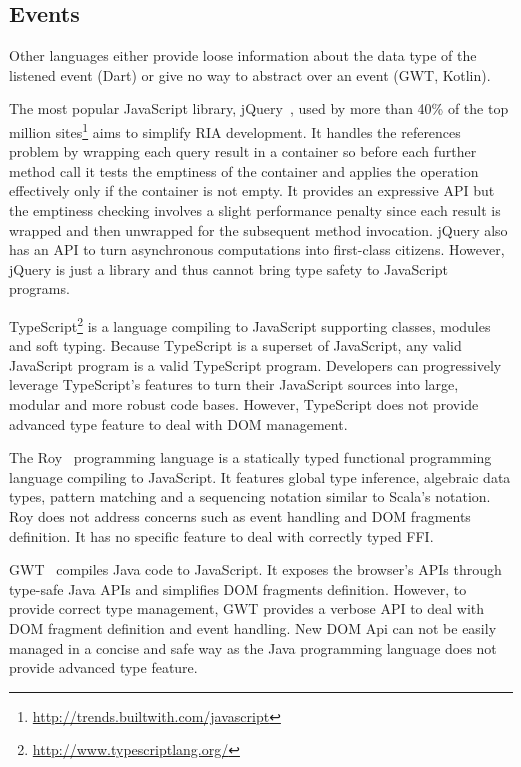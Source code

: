 \documentclass[runningheads,a4paper]{llncs}
\begin{document}
\subsection{Events}


Other languages either provide loose information about the data type of the listened event (Dart) or
give no way to abstract over an event (GWT, Kotlin).

The most popular JavaScript library, jQuery~\cite{Bibeault08_jQuery}, used by more than 40\% of the top million
sites\footnote{\href{http://trends.builtwith.com/javascript}{http://trends.builtwith.com/javascript}} aims to
simplify RIA development. It handles the  references problem by wrapping each query result in a container
so before each further method call it tests the emptiness of the container and applies the operation effectively only
if the container is not empty. It provides an expressive API but the emptiness checking involves a slight performance
penalty since each result is wrapped and then unwrapped for the subsequent method invocation. jQuery also has an API
to turn asynchronous computations into first-class citizens. However, jQuery is just a library and thus cannot bring
type safety to JavaScript programs.

TypeScript\footnote{\href{http://www.typescriptlang.org/}{http://www.typescriptlang.org/}} is a language compiling to
JavaScript supporting classes, modules and soft typing. Because TypeScript is a superset of JavaScript, any valid
JavaScript program is a valid TypeScript program. Developers can progressively leverage TypeScript’s features to turn
their JavaScript sources into large, modular and more robust code bases. However, TypeScript does not provide advanced type feature to deal with DOM management.

The Roy~\cite{McKenna_Roy} programming language is a statically typed functional programming language compiling to
JavaScript. It features global type inference, algebraic data types, pattern matching and a sequencing notation
similar to Scala’s  notation. Roy does not address concerns such as event handling and DOM fragments
definition. It has no specific feature to deal with correctly typed FFI. 


GWT~\cite{Chaganti07_GWT} compiles Java code to JavaScript. It exposes the browser’s APIs through type-safe Java APIs
and simplifies DOM fragments definition. However, to provide correct type management, GWT provides a verbose API to deal with DOM fragment definition and event handling. New DOM Api can not be easily managed in a concise and safe way as the Java programming language does not provide advanced type feature. 
\end{document}
